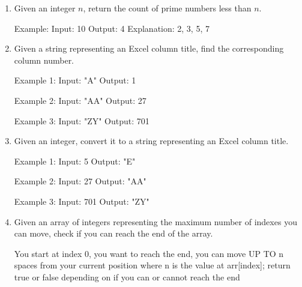 \begin{enumerate}
\item Given an integer $n$, return the count of prime numbers less than $n$.

\begin{consolethree}
Example:
Input: 10
Output: 4
Explanation: 2, 3, 5, 7
\end{consolethree}
\newpage


\item
  Given a string representing an Excel column title, find the corresponding column number.

\begin{consolethree}
Example 1:
Input: "A"
Output: 1

Example 2:
Input: "AA"
Output: 27

Example 3:
Input: "ZY"
Output: 701
\end{consolethree}
\newpage


\item Given an integer, convert it to a string representing an Excel column title.

\begin{consolethree}
Example 1:
Input: 5
Output: "E"

Example 2:
Input: 27
Output: "AA"

Example 3:
Input: 701
Output: "ZY"
\end{consolethree}
\newpage







\item
  Given an array of integers representing the maximum number of indexes you can move, check if you can reach the end of the array.

You start at index 0, you want to reach the end, you can move UP TO n spaces from your current position where n is the value at arr[index]; return true or false depending on if you can or cannot reach the end


\end{enumerate}
